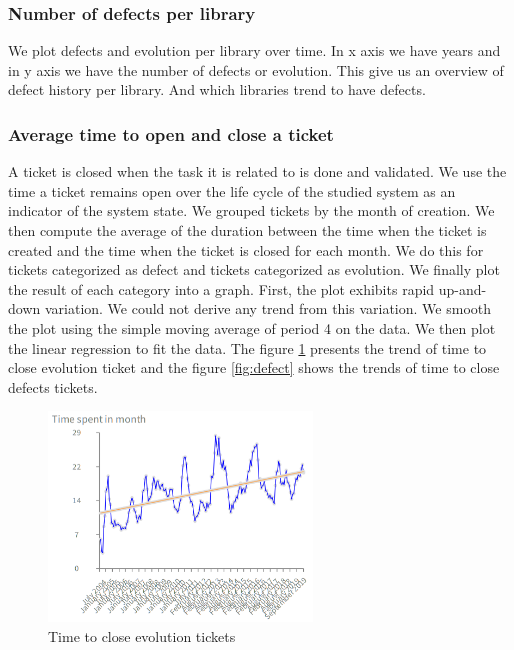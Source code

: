 \documentclass[10pt,conference]{IEEEtran}
\begin{document}
 \subsubsection{Number of defects per library}

We plot  defects and evolution per library over time.  In x axis we have years and in y axis  we have the number of defects  or evolution.
This give us an overview of defect  history per library. And  which libraries   trend to have defects.

\subsubsection{ Average time to open and close a ticket}

A ticket is closed when the task it is related to is done and validated. 
We use the time a ticket remains open over the life cycle of the studied system as an indicator of the system state. 
We grouped tickets by the month of creation.
We then compute the average of  the duration between the time when the ticket is created and the time when the ticket is closed for each month.  
We do this for tickets categorized as defect and tickets categorized as evolution. 
We finally plot the result of each category into a graph.  First, the plot exhibits rapid up-and-down variation.
We could not derive any trend from this variation. 
We smooth the plot using the simple moving average of period 4 on the data.  
We then plot the linear regression to fit the data.  
The figure \ref{fig:evol} presents the trend of time to close evolution ticket and  the figure \ref{fig:defect} shows  the trends  of time to close defects tickets.

\begin{figure}[H]
  \centering
  \includegraphics[width=70mm]{./images/openCloseEvol.png}
  \caption{Time to close evolution tickets}
  \label{fig:evol}
\end{figure}
\end{document}
